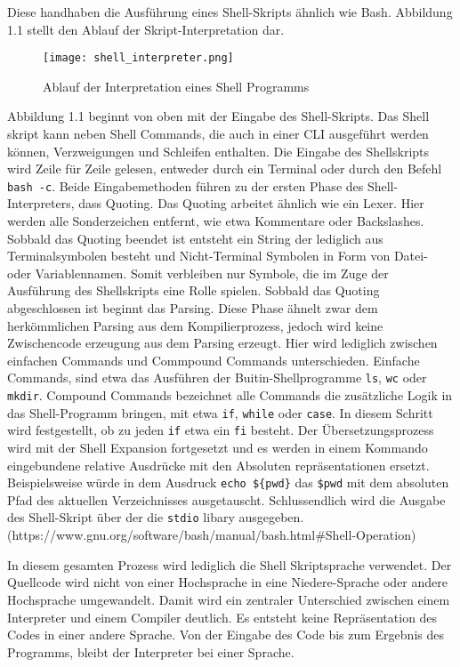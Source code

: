 Diese handhaben die Ausführung eines Shell-Skripts ähnlich wie Bash. Abbildung 1.1 stellt den Ablauf der Skript-Interpretation dar.

\begin{figure}[h]
  \centering
  \caption{Ablauf der Interpretation eines Shell Programms}
  \texttt{[image: shell\_interpreter.png]}
  \label{fig:shell}
\end{figure}
\pagebreak
Abbildung 1.1 beginnt von oben mit der Eingabe des Shell-Skripts. Das Shell skript kann neben Shell Commands, die auch in einer CLI ausgeführt werden können, Verzweigungen und Schleifen enthalten. Die Eingabe des Shellskripts wird Zeile für Zeile gelesen, entweder durch ein Terminal oder durch den Befehl \verb+bash -c+. 
Beide Eingabemethoden führen zu der ersten Phase des Shell-Interpreters, dass Quoting. Das Quoting arbeitet ähnlich wie ein Lexer. Hier werden alle Sonderzeichen entfernt, wie etwa Kommentare oder Backslashes. Sobbald das Quoting beendet ist entsteht ein String der lediglich aus Terminalsymbolen besteht und Nicht-Terminal Symbolen in Form von Datei- oder Variablennamen. Somit verbleiben nur Symbole, die im Zuge der Ausführung des Shellskripts eine Rolle spielen. 
Sobbald das Quoting abgeschlossen ist beginnt das Parsing. Diese Phase ähnelt zwar dem herkömmlichen Parsing aus dem Kompilierprozess, jedoch wird keine Zwischencode erzeugung aus dem Parsing erzeugt. Hier wird lediglich zwischen einfachen Commands und Commpound Commands unterschieden. Einfache Commands, sind etwa das Ausführen der Buitin-Shellprogramme \verb+ls+, \verb+wc+ oder \verb+mkdir+. Compound Commands bezeichnet alle Commands die zusätzliche Logik in das Shell-Programm bringen, mit etwa \verb+if+, \verb+while+ oder \verb+case+. In diesem Schritt wird festgestellt, ob zu jeden \verb+if+ etwa ein \verb+fi+ besteht. 
Der Übersetzungsprozess wird mit der Shell Expansion fortgesetzt und es werden in einem Kommando eingebundene relative Ausdrücke mit den Absoluten repräsentationen ersetzt. Beispielsweise würde in dem Ausdruck  \verb+echo ${pwd}+ das \verb+$pwd+ mit dem absoluten Pfad des aktuellen Verzeichnisses ausgetauscht.
Schlussendlich wird die Ausgabe des Shell-Skript über der die \verb+stdio+ libary ausgegeben. 
(https://www.gnu.org/software/bash/manual/bash.html#Shell-Operation)

In diesem gesamten Prozess wird lediglich die Shell Skriptsprache verwendet. Der Quellcode wird nicht von einer Hochsprache in eine Niedere-Sprache oder andere Hochsprache umgewandelt. Damit wird ein zentraler Unterschied zwischen einem Interpreter und einem Compiler deutlich. Es entsteht keine Repräsentation des Codes in einer andere Sprache. Von der Eingabe des Code bis zum Ergebnis des Programms, bleibt der Interpreter bei einer Sprache.

